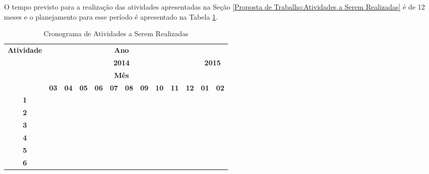 O tempo previsto para a realização das atividades apresentadas na Seção \ref{Proposta de Trabalho:Atividades a Serem Realizadas} é de 12 meses e o planejamento para esse período é apresentado na Tabela \ref{Proposta de Trabalho:Tabela:Cronorgrama de Atividades a Serem Realizadas}.

\begin{table}[!htb]
	\renewcommand{\arraystretch}{1.2}
	\centering
	\caption{Cronograma de Atividades a Serem Realizadas}
	\label{Proposta de Trabalho:Tabela:Cronorgrama de Atividades a Serem Realizadas}
	\begin{tabular}{c|c|c|c|c|c|c|c|c|c|c|c|c}
		\toprule
		\multirow{4}{*}{\textbf{Atividade}} & \multicolumn{10}{c}{\textbf{Ano}} \\ 
		\cline{2-13} 
		& \multicolumn{10}{c|}{\textbf{2014}} & \multicolumn{2}{c}{\textbf{2015}} \\ 
		\cline{2-13} 
		& \multicolumn{10}{c}{\textbf{Mês}} \\ 
		\cline{2-13} 
		& \textbf{03} & \textbf{04} & \textbf{05} & \textbf{06} & \textbf{07} & \textbf{08} & \textbf{09} & \textbf{10} & \textbf{11} & \textbf{12} & \textbf{01} & \textbf{02}\\ 
		\bottomrule
		\textbf{1} & \cellcolor{darkgray} & \cellcolor{darkgray} & \cellcolor{darkgray} & \cellcolor{darkgray} & \cellcolor{darkgray} & & & & & & & \\ \hline
		\textbf{2} & & & & \cellcolor{darkgray} & \cellcolor{darkgray} & \cellcolor{darkgray} & & & & & & \\ \hline
		\textbf{3} & & & & & & \cellcolor{darkgray} & \cellcolor{darkgray} & \cellcolor{darkgray} & \cellcolor{darkgray} & & & \\ \hline
		\textbf{4} & & & & & & & & \cellcolor{darkgray} & \cellcolor{darkgray} & \cellcolor{darkgray} & \cellcolor{darkgray} & \cellcolor{darkgray} \\ \hline
		\textbf{5} & & & & & & & & \cellcolor{darkgray} & \cellcolor{darkgray} & \cellcolor{darkgray} & \cellcolor{darkgray} & \cellcolor{darkgray} \\ \hline
		\textbf{6} & & & & & & & & & & & & \cellcolor{darkgray} \\
		\toprule
	\end{tabular}
\end{table}